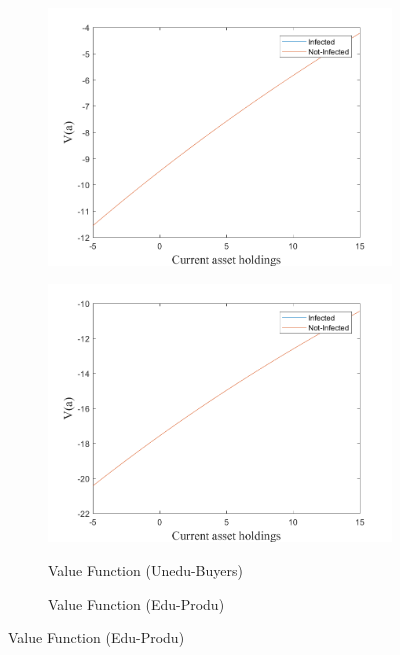 \begin{figure}[H]
\begin{subfigure}{0.5\textwidth}
   \includegraphics[width=\linewidth,height = 0.22\textheight]{figures/pre/FIG13.png}
    \label{fig_dert}
\end{subfigure}
\hspace*{\fill}
\begin{subfigure}{0.5\textwidth}\caption{Value Function (Unedu-Buyers)}
   \includegraphics[width=\linewidth,height = 0.22\textheight]{figures/pre/FIG14.png}
    \label{fig:x_b}
\end{subfigure}
\bigskip
\begin{subfigure}{0.5\textwidth}\caption{Value Function (Edu-Produ)}

\end{subfigure}
\end{figure}
